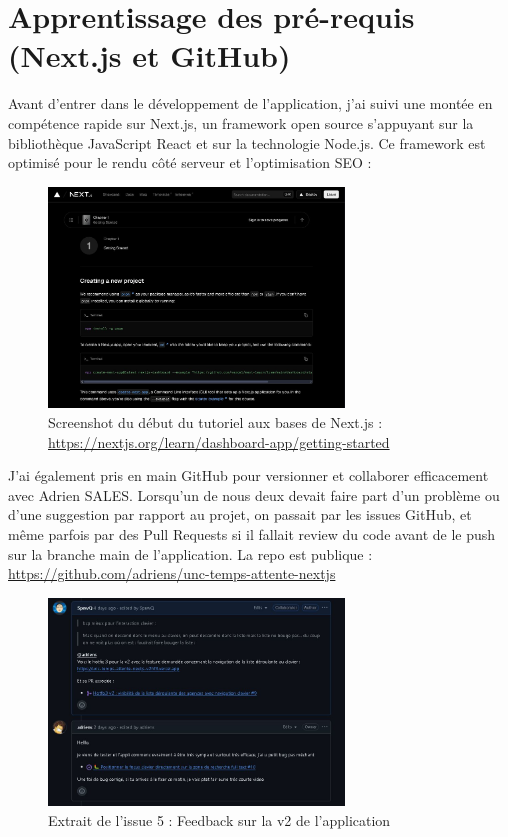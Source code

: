 \documentclass[12pt,a4paper]{report}
\begin{document}
\section{Apprentissage des pré-requis (Next.js et GitHub)}
Avant d’entrer dans le développement de l'application, j’ai suivi une \cite{tuto_next} montée en compétence rapide sur Next.js, un framework open source s'appuyant sur la bibliothèque JavaScript React et sur la technologie Node.js. Ce framework est optimisé pour le rendu côté serveur et l’optimisation SEO : 

\vspace{1cm}
\begin{figure}[h] %
    \centering
    \includegraphics[width=0.7\textwidth]{ressources_rapport/learn_next.JPG}
    \caption{Screenshot du début du tutoriel aux bases de Next.js : \href{https://nextjs.org/learn/dashboard-app/getting-started}{https://nextjs.org/learn/dashboard-app/getting-started}}
\end{figure}

\vspace{1cm}
J’ai également pris en main GitHub pour versionner et collaborer efficacement avec Adrien SALES. Lorsqu'un de nous deux devait faire part d'un problème ou d'une suggestion par rapport au projet, on passait par les issues GitHub, et même parfois par des Pull Requests si il fallait review du code avant de le push sur la branche main de l'application. \cite{repo} La repo est publique : \href{https://github.com/adriens/unc-temps-attente-nextjs}{https://github.com/adriens/unc-temps-attente-nextjs}

\vspace{1cm}
\begin{figure}[h] %
    \centering
    \includegraphics[width=0.7\textwidth]{ressources_rapport/extrait_issue_5.JPG}
    \caption{Extrait de l'issue 5 : Feedback sur la v2 de l'application}
\end{figure}
\end{document}
